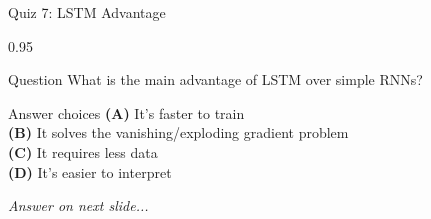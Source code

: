 \documentclass[9pt, aspectratio=169, t]{beamer}
\begin{document}
\begin{frame}{Quiz 7: LSTM Advantage}
    \begin{cminipage}{0.95\textwidth}
    \begin{alertblock}{Question}
        What is the main advantage of LSTM over simple RNNs?
    \end{alertblock}

    \vspace{0.4cm}

    \begin{block}{Answer choices}
        \textcolor{MainBlue}{\textbf{(A)}} It's faster to train\\[3pt]
        \textcolor{MainBlue}{\textbf{(B)}} It solves the vanishing/exploding gradient problem\\[3pt]
        \textcolor{MainBlue}{\textbf{(C)}} It requires less data\\[3pt]
        \textcolor{MainBlue}{\textbf{(D)}} It's easier to interpret
    \end{block}

    \vspace{0.5cm}

    \begin{center}
        \textit{Answer on next slide...}
    \end{center}
    \end{cminipage}
\end{frame}
\end{document}

